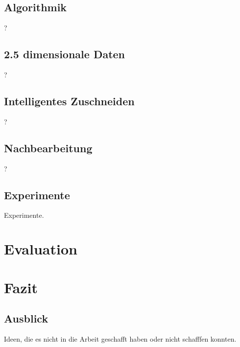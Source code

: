 \subsection{Algorithmik}
?

\subsection{2.5 dimensionale Daten}
?

\subsection{Intelligentes Zuschneiden}
?

\subsection{Nachbearbeitung }
?

\subsection{Experimente}
Experimente.

\section{Evaluation}\raggedbottom

\section{Fazit}\raggedbottom

\subsection{Ausblick}
Ideen, die es nicht in die Arbeit geschafft haben oder nicht schafffen konnten.


